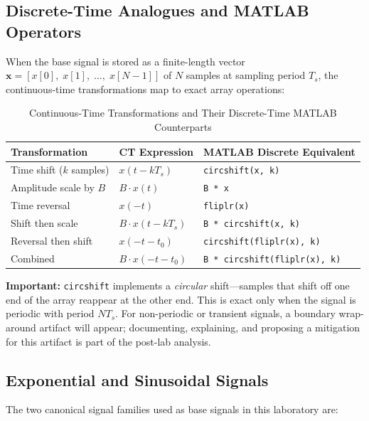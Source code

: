 \documentclass[11pt,letterpaper]{article}
\begin{document}
\subsection{Discrete-Time Analogues and MATLAB Operators}

When the base signal is stored as a finite-length vector $\mathbf{x} = [x[0],\; x[1],\; \ldots,\; x[N-1]]$ of $N$ samples at sampling period $T_s$, the continuous-time transformations map to exact array operations:

\begin{table}[H]
    \centering
    \caption{Continuous-Time Transformations and Their Discrete-Time MATLAB Counterparts}
    \label{tab:transforms}
    \begin{tabularx}{\linewidth}{l l X}
    \toprule
    \textbf{Transformation} & \textbf{CT Expression} & \textbf{MATLAB Discrete Equivalent}\\
    \midrule
    Time shift ($k$ samples) & $x(t - kT_s)$ & \texttt{circshift(x, k)} \\
    Amplitude scale by $B$   & $B \cdot x(t)$ & \texttt{B * x} \\
    Time reversal            & $x(-t)$        & \texttt{fliplr(x)} \\
    Shift then scale         & $B \cdot x(t - kT_s)$ & \texttt{B * circshift(x, k)} \\
    Reversal then shift      & $x(-t - t_0)$  & \texttt{circshift(fliplr(x), k)} \\
    Combined                 & $B \cdot x(-t - t_0)$ & \texttt{B * circshift(fliplr(x), k)} \\
    \bottomrule
    \end{tabularx}
\end{table}

\noindent\textbf{Important:} \texttt{circshift} implements a \emph{circular} shift---samples that shift off one end of the array reappear at the other end. This is exact only when the signal is periodic with period $NT_s$. For non-periodic or transient signals, a boundary wrap-around artifact will appear; documenting, explaining, and proposing a mitigation for this artifact is part of the post-lab analysis.

\subsection{Exponential and Sinusoidal Signals}

The two canonical signal families used as base signals in this laboratory are:
\end{document}
